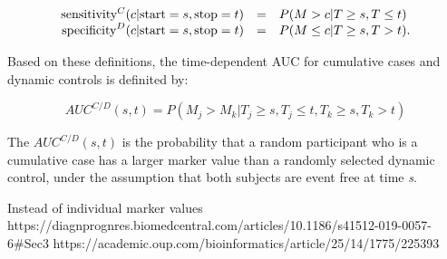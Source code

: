 $$\begin{array}{@{}rcl@{}} \text{sensitivity}^{C}(c|\text{start}=s, \text{stop}=t) &=& P(M > c | T \geq s, T \leq t) \\ \text{specificity}^{D}(c|\text{start}=s, \text{stop}=t) &=& P(M \leq c | T \geq s, T > t). \end{array}$$

Based on these definitions, the time-dependent AUC for cumulative cases and dynamic controls is definited by:  

$$AUC^{C/D}(s,t) = P(M_j > M_k | T_j \geq s, T_j \leq t, T_k \geq s, T_k > t)$$

The $AUC^{C/D}(s,t)$ is the probability that a random participant who is a cumulative case has a larger marker value than a randomly selected dynamic control, under the assumption that both subjects are event free at time \textit{s}. 

Instead of individual marker values 
https://diagnprognres.biomedcentral.com/articles/10.1186/s41512-019-0057-6#Sec3
https://academic.oup.com/bioinformatics/article/25/14/1775/225393









